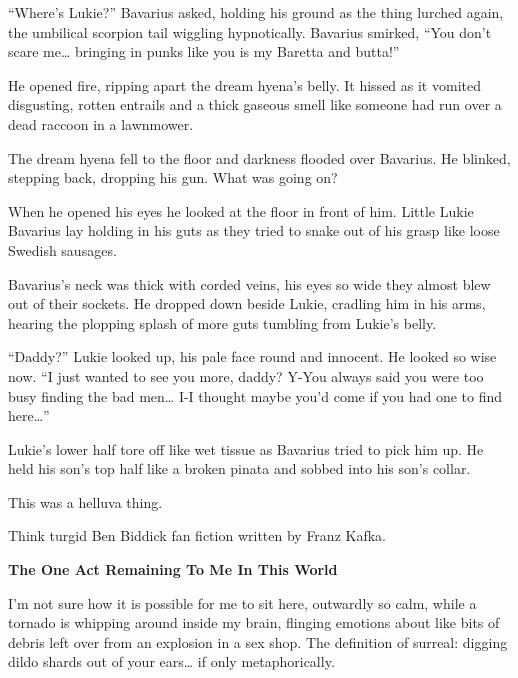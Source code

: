 ``Where's Lukie?'' Bavarius asked, holding his ground as the thing
lurched again, the umbilical scorpion tail wiggling hypnotically.
Bavarius smirked, ``You don't scare me{\ldots} bringing in punks like you
is my Baretta and butta!''



He opened fire, ripping apart the dream hyena's belly. It hissed as
it vomited disgusting, rotten entrails and a thick gaseous smell
like someone had run over a dead raccoon in a lawnmower.



The dream hyena fell to the floor and darkness flooded over
Bavarius. He blinked, stepping back, dropping his gun. What was
going on?



When he opened his eyes he looked at the floor in front of him.
Little Lukie Bavarius lay holding in his guts as they tried to
snake out of his grasp like loose Swedish sausages.



Bavarius's neck was thick with corded veins, his eyes so wide they
almost blew out of their sockets. He dropped down beside Lukie,
cradling him in his arms, hearing the plopping splash of more guts
tumbling from Lukie's belly.



``Daddy?'' Lukie looked up, his pale face round and innocent. He
looked so wise now. ``I just wanted to see you more, daddy? Y-You
always said you were too busy finding the bad men{\ldots} I-I thought
maybe you'd come if you had one to find here{\ldots}''



Lukie's lower half tore off like wet tissue as Bavarius tried to
pick him up. He held his son's top half like a broken pinata and
sobbed into his son's collar.



This was a helluva thing. 
 





Think turgid Ben Biddick fan fiction written by Franz Kafka.



{\bf The One Act Remaining To Me In This World}



I'm not sure how it is possible for me to sit here, outwardly
so calm, while a tornado is whipping around inside my brain,
flinging emotions about like bits of debris left over from an
explosion in a sex shop. The definition of surreal: digging dildo
shards out of your ears{\ldots} if only metaphorically.



